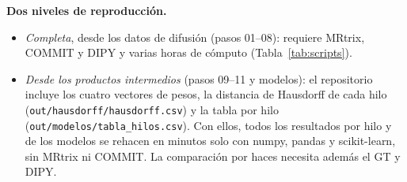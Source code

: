 \documentclass[11pt,a4paper]{article}
\newcommand{\code}[1]{\texttt{\small #1}}
\begin{document}
\textbf{Dos niveles de reproducci\'on.}
\begin{itemize}
  \item \emph{Completa}, desde los datos de difusi\'on (pasos 01--08): requiere MRtrix,
        COMMIT y DIPY y varias horas de c\'omputo (Tabla~\ref{tab:scripts}).
  \item \emph{Desde los productos intermedios} (pasos 09--11 y modelos): el repositorio
        incluye los cuatro vectores de pesos, la distancia de Hausdorff de cada hilo
        (\code{out/hausdorff/hausdorff.csv}) y la tabla por hilo
        (\code{out/modelos/tabla\_hilos.csv}). Con ellos, todos los resultados por hilo y de
        los modelos se rehacen en minutos solo con numpy, pandas y scikit-learn, sin MRtrix
        ni COMMIT. La comparaci\'on por haces necesita adem\'as el GT y DIPY.
\end{itemize}
\end{document}
